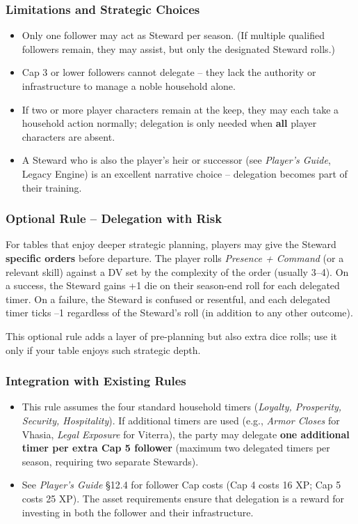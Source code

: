 \documentclass[11pt]{article}
\begin{document}
\subsubsection*{Limitations and Strategic Choices}
\begin{itemize}
    \item Only one follower may act as Steward per season. (If multiple qualified followers remain, they may assist, but only the designated Steward rolls.)
    \item Cap 3 or lower followers cannot delegate -- they lack the authority or infrastructure to manage a noble household alone.
    \item If two or more player characters remain at the keep, they may each take a household action normally; delegation is only needed when \textbf{all} player characters are absent.
    \item A Steward who is also the player's heir or successor (see \textit{Player's Guide}, Legacy Engine) is an excellent narrative choice -- delegation becomes part of their training.
\end{itemize}

\subsubsection*{Optional Rule -- Delegation with Risk}
For tables that enjoy deeper strategic planning, players may give the Steward \textbf{specific orders} before departure. The player rolls \textit{Presence + Command} (or a relevant skill) against a DV set by the complexity of the order (usually 3--4). On a success, the Steward gains +1 die on their season-end roll for each delegated timer. On a failure, the Steward is confused or resentful, and each delegated timer ticks --1 regardless of the Steward's roll (in addition to any other outcome).

This optional rule adds a layer of pre-planning but also extra dice rolls; use it only if your table enjoys such strategic depth.

\subsubsection*{Integration with Existing Rules}
\begin{itemize}
    \item This rule assumes the four standard household timers (\textit{Loyalty, Prosperity, Security, Hospitality}). If additional timers are used (e.g., \textit{Armor Closes} for Vhasia, \textit{Legal Exposure} for Viterra), the party may delegate \textbf{one additional timer per extra Cap 5 follower} (maximum two delegated timers per season, requiring two separate Stewards).
    \item See \textit{Player's Guide} §12.4 for follower Cap costs (Cap 4 costs 16 XP; Cap 5 costs 25 XP). The asset requirements ensure that delegation is a reward for investing in both the follower and their infrastructure.
\end{itemize}
\end{document}
